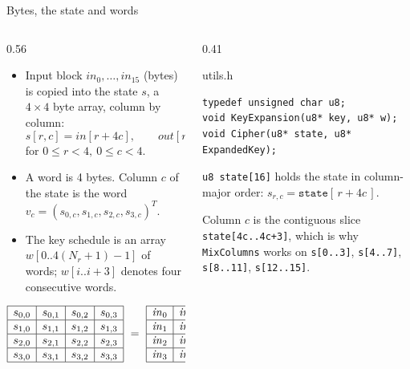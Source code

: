 \documentclass[aspectratio=169,10pt]{beamer}
\newcommand{\Nr}{N_{r}}
\begin{document}
\begin{frame}[fragile]{Bytes, the state and words}
\begin{columns}[T]
\begin{column}{0.56\textwidth}
\begin{itemize}\footnotesize
\item Input block $\mathit{in}_0,\dots,\mathit{in}_{15}$ (bytes) is copied into the
  \alert{state} $s$, a $4\times4$ byte array, \alert{column by column}:
  \[ s[r,c]=\mathit{in}[r+4c],\qquad \mathit{out}[r+4c]=s[r,c], \]
  for $0\le r<4,\ 0\le c<4$.
\item A \alert{word} is 4 bytes. Column $c$ of the state is the word
  $v_c=(s_{0,c},s_{1,c},s_{2,c},s_{3,c})^{T}$.
\item The key schedule is an array $w[0..4(\Nr{+}1){-}1]$ of words;
  $w[i..i{+}3]$ denotes four consecutive words.
\end{itemize}
\vskip2pt
\scriptsize\centering
$\begin{array}{|c|c|c|c|}\hline
s_{0,0} & s_{0,1} & s_{0,2} & s_{0,3}\\\hline
s_{1,0} & s_{1,1} & s_{1,2} & s_{1,3}\\\hline
s_{2,0} & s_{2,1} & s_{2,2} & s_{2,3}\\\hline
s_{3,0} & s_{3,1} & s_{3,2} & s_{3,3}\\\hline
\end{array}\ =\
\begin{array}{|c|c|c|c|}\hline
\mathit{in}_0 & \mathit{in}_4 & \mathit{in}_8 & \mathit{in}_{12}\\\hline
\mathit{in}_1 & \mathit{in}_5 & \mathit{in}_9 & \mathit{in}_{13}\\\hline
\mathit{in}_2 & \mathit{in}_6 & \mathit{in}_{10} & \mathit{in}_{14}\\\hline
\mathit{in}_3 & \mathit{in}_7 & \mathit{in}_{11} & \mathit{in}_{15}\\\hline
\end{array}$
\end{column}
\begin{column}{0.41\textwidth}
\begin{tbox}{utils.h}
\begin{lstlisting}
typedef unsigned char u8;
void KeyExpansion(u8* key, u8* w);
void Cipher(u8* state, u8* ExpandedKey);
\end{lstlisting}
\end{tbox}
\vskip4pt
\begin{pbox}\footnotesize
\texttt{u8 state[16]} holds the state in \alert{column-major} order:
$s_{r,c}=\texttt{state}[\,r+4c\,]$.\par\vskip2pt
Column $c$ is the contiguous slice \texttt{state[4c..4c+3]}, which is why
\texttt{MixColumns} works on \texttt{s[0..3]}, \texttt{s[4..7]}, \texttt{s[8..11]}, \texttt{s[12..15]}.\par\vskip2pt
\end{pbox}
\end{column}
\end{columns}
\end{frame}
\end{document}
